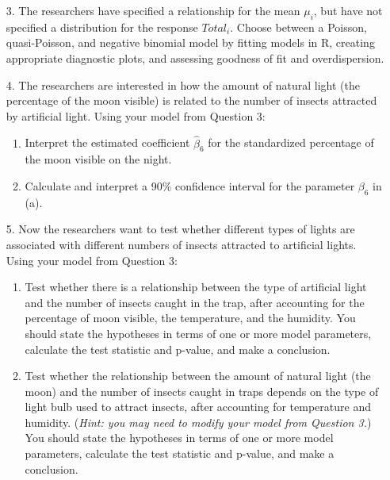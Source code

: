 \documentclass[11pt]{article}
\begin{document}
\begin{enumerate}
\item[3.] The researchers have specified a relationship for the mean $\mu_i$, but have not specified a distribution for the response $Total_i$. Choose between a Poisson, quasi-Poisson, and negative binomial model by fitting models in R, creating appropriate diagnostic plots, and assessing goodness of fit and overdispersion.

\item[4.] The researchers are interested in how the amount of natural light (the percentage of the moon visible) is related to the number of insects attracted by artificial light.  Using your model from Question 3:
\begin{enumerate}
\item Interpret the estimated coefficient $\widehat{\beta}_6$ for the standardized percentage of the moon visible on the night.

\item Calculate and interpret a 90\% confidence interval for the parameter $\beta_6$ in (a).
\end{enumerate}

\newpage

\item[5.] Now the researchers want to test whether different types of lights are associated with different numbers of insects attracted to artificial lights. Using your model from Question 3:
\begin{enumerate}
\item Test whether there is a relationship between the type of artificial light and the number of insects caught in the trap, after accounting for the percentage of moon visible, the temperature, and the humidity. You should state the hypotheses in terms of one or more model parameters, calculate the test statistic and p-value, and make a conclusion.
\item Test whether the relationship between the amount of natural light (the moon) and the number of insects caught in traps depends on the type of light bulb used to attract insects, after accounting for temperature and humidity. (\textit{Hint: you may need to modify your model from Question 3.}) You should state the hypotheses in terms of one or more model parameters, calculate the test statistic and p-value, and make a conclusion.
\end{enumerate}
\end{enumerate}
\end{document}
